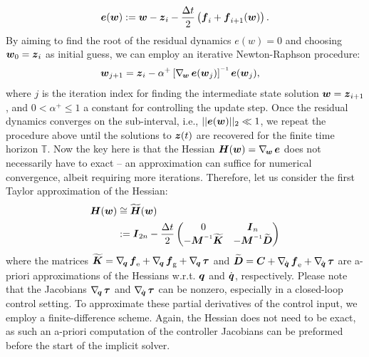 %
\begin{align}
{\boldsymbol{e}}({\boldsymbol{w}}) :=  {\boldsymbol{w}} - {\boldsymbol{z}}_{i} - \frac{\Delta t}{2} \left( {\boldsymbol{f}}_i + {\boldsymbol{f}}_{i+1}({\boldsymbol{w}})  \right).
\end{align}
%
By aiming to find the root of the residual dynamics $e(w) = 0$ and choosing ${\boldsymbol{w}}_{0} = {\boldsymbol{z}}_{i}$ as initial guess, we can employ an iterative Newton-Raphson procedure:
%
\begin{align}
\wB_{j+1} & = \zB_i  - \alpha^+ \left[\grad{\wB}\eB(\wB_j)\right]\inv \eB(\wB_{j}),
\end{align}
%
where $j$ is the iteration index for finding the intermediate state solution ${\boldsymbol{w}}={\boldsymbol{z}}_{i+1}$, and $0 < \alpha^+ \le 1$ a constant for controlling the update step. Once the residual dynamics converges on the sub-interval, i.e., $||{\boldsymbol{e}}({\boldsymbol{w}})||_2 \ll 1$, we repeat the procedure above until the solutions to ${\boldsymbol{z}}(t)$ are recovered for the finite time horizon $\mathbb{T}$. Now the key here is that the Hessian ${\boldsymbol{H}}({\boldsymbol{w}}) = \nabla_{\!{\boldsymbol{w}}}\, {\boldsymbol{e}}$ does not necessarily have to exact -- an approximation can suffice for numerical convergence, albeit requiring more iterations. Therefore, let us consider the first Taylor approximation of the Hessian:
%
\begin{align}
    \HB(\wB) & \cong \tmat{H}(\wB) \\ & := \mat{I}_{2n } - \frac{\Delta t}{2} \begin{pmatrix} 0 & \mat{I}_{n}  \\
 -\mat{M} \inv \tmat{K} & -\MB\inv \tmat{D}
  \end{pmatrix}
\end{align}
where the matrices $\widetilde{\boldsymbol{K}} = \nabla_{\!{\boldsymbol{q}}}\,{\boldsymbol{f}}_{\scriptstyle\textrm{e}} + \nabla_{\!{\boldsymbol{q}}}\,{\boldsymbol{f}}_{\scriptstyle\textrm{g}} + \nabla_{\!{\boldsymbol{q}}}\,\boldsymbol{\tau}$ and $\widetilde{\boldsymbol{D}} = {\boldsymbol{C}} + \nabla_{\!{\dot{\boldsymbol{q}}}}\,{\boldsymbol{f}}_{\scriptstyle\textrm{e}} + \nabla_{\!{\dot{\boldsymbol{q}}}}\,\boldsymbol{\tau}$ are a-priori approximations of the Hessians w.r.t. ${\boldsymbol{q}}$ and ${\dot{\boldsymbol{q}}}$, respectively. Please note that the Jacobians $\nabla_{\!{\boldsymbol{q}}}\,\boldsymbol{\tau}$ and $\nabla_{\!{\dot{\boldsymbol{q}}}}\,\boldsymbol{\tau}$ can be nonzero, especially in a closed-loop control setting. To approximate these partial derivatives of the control input, we employ a finite-difference scheme. Again, the Hessian does not need to be exact, as such an a-priori computation of the controller Jacobians can be preformed before the start of the implicit solver.

